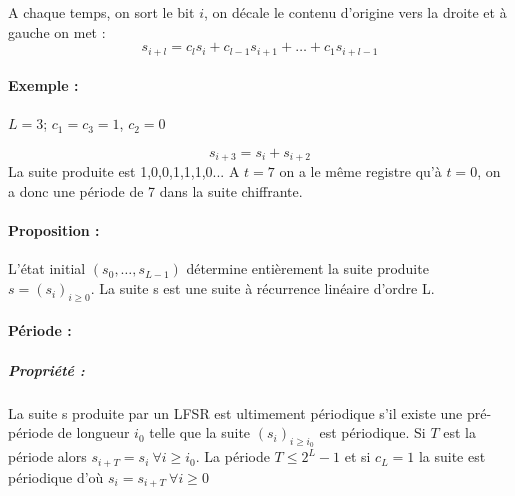 \documentclass[12pt,a4paper]{report}
\begin{document}
A chaque temps, on sort le bit $i$, on décale le contenu d'origine vers la droite et à gauche on met :
$$ s_{i+l}=c_ls_i + c_{l-1}s_{i+1}+ \ldots + c_1s_{i+l-1} $$
\begin{figure}[h!]
	\centering
  \scalebox{0.45}{}	
\end{figure}





\paragraph{Exemple :} $L=3$; $c_1=c_3=1$, $c_2=0$

\begin{figure}[h]
	\centering
  \scalebox{0.5}{}	
\end{figure}

$$s_{i+3}=s_i+s_{i+2} $$
La suite produite est 1,0,0,1,1,1,0... A $t=7$ on a le même registre qu'à $t=0$, on a donc une période de 7 dans la suite chiffrante.
\paragraph{Proposition :\\}
L'état initial $(s_0,\ldots,s_{L-1})$ détermine entièrement la suite produite $s=(s_i)_{i\geqslant 0}$. La suite s est une suite à récurrence linéaire d'ordre L.

\paragraph{Période :}
\subparagraph{Propriété :\\}
La suite s produite par un LFSR est ultimement périodique s'il existe une pré-période de longueur $i_0$ telle que la suite $(s_i)_{i\geqslant i_0}$ est périodique. Si $T$ est la période alors $s_{i+T} = s_i\ \forall i\geqslant i_0$. La période $T \leqslant 2^L-1$ et si $c_L = 1$ la suite est périodique d'où $s_i = s_{i+T}\ \forall i \geqslant 0 $
\end{document}
